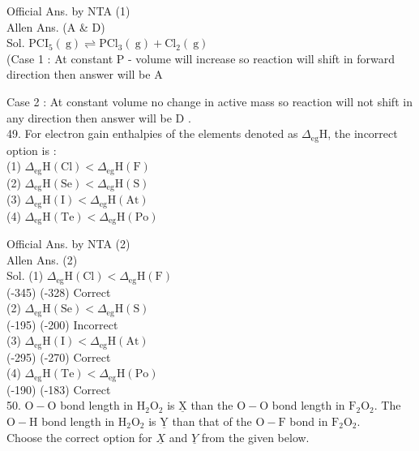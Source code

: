 \documentclass[10pt]{article}
\begin{document}
Official Ans. by NTA (1)\\
Allen Ans. (A \& D)\\
Sol. \(\mathrm{PCI}_{5}(\mathrm{~g}) \rightleftharpoons \mathrm{PCl}_{3}(\mathrm{~g})+\mathrm{Cl}_{2}(\mathrm{~g})\)\\
(Case 1 : At constant P - volume will increase so reaction will shift in forward direction then answer will be A

Case 2 : At constant volume no change in active mass so reaction will not shift in any direction then answer will be D .\\
49. For electron gain enthalpies of the elements denoted as \(\Delta_{\mathrm{eg}} \mathrm{H}\), the incorrect option is :\\
(1) \(\Delta_{\mathrm{eg}} \mathrm{H}(\mathrm{Cl})<\Delta_{\mathrm{eg}} \mathrm{H}(\mathrm{F})\)\\
(2) \(\Delta_{\mathrm{eg}} \mathrm{H}(\mathrm{Se})<\Delta_{\mathrm{eg}} \mathrm{H}(\mathrm{S})\)\\
(3) \(\Delta_{\mathrm{eg}} \mathrm{H}(\mathrm{I})<\Delta_{\mathrm{eg}} \mathrm{H}(\mathrm{At})\)\\
(4) \(\Delta_{\mathrm{eg}} \mathrm{H}(\mathrm{Te})<\Delta_{\mathrm{eg}} \mathrm{H}(\mathrm{Po})\)

Official Ans. by NTA (2)\\
Allen Ans. (2)\\
Sol. (1) \(\Delta_{\mathrm{eg}} \mathrm{H}(\mathrm{Cl})<\Delta_{\mathrm{eg}} \mathrm{H}(\mathrm{F})\)\\
(-345) (-328) Correct\\
(2) \(\Delta_{\mathrm{eg}} \mathrm{H}(\mathrm{Se})<\Delta_{\mathrm{eg}} \mathrm{H}(\mathrm{S})\)\\
(-195) (-200) Incorrect\\
(3) \(\Delta_{\mathrm{eg}} \mathrm{H}(\mathrm{I})<\Delta_{\mathrm{eg}} \mathrm{H}(\mathrm{At})\)\\
(-295) (-270) Correct\\
(4) \(\Delta_{\mathrm{eg}} \mathrm{H}(\mathrm{Te})<\Delta_{\mathrm{eg}} \mathrm{H}(\mathrm{Po})\)\\
(-190) (-183) Correct\\
50. \(\mathrm{O}-\mathrm{O}\) bond length in \(\mathrm{H}_{2} \mathrm{O}_{2}\) is \(\underline{\mathrm{X}}\) than the \(\mathrm{O}-\mathrm{O}\) bond length in \(\mathrm{F}_{2} \mathrm{O}_{2}\). The \(\mathrm{O}-\mathrm{H}\) bond length in \(\mathrm{H}_{2} \mathrm{O}_{2}\) is \(\underline{\mathrm{Y}}\) than that of the \(\mathrm{O}-\mathrm{F}\) bond in \(\mathrm{F}_{2} \mathrm{O}_{2}\).\\
Choose the correct option for \(\underline{X}\) and \(\underline{Y}\) from the given below.
\end{document}
